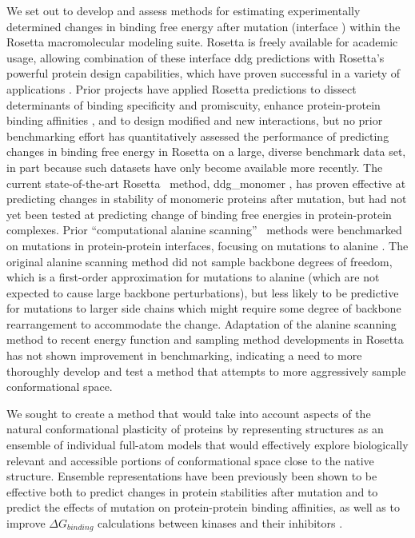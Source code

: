 We set out to develop and assess methods for estimating experimentally determined changes in binding free energy after mutation (interface \ddg) within the Rosetta macromolecular modeling suite. Rosetta is freely available for academic usage, allowing combination of these interface ddg predictions with Rosetta's powerful protein design capabilities, which have proven successful in a variety of applications \cite{kaufmann_practically_2010}.
Prior projects have applied Rosetta predictions to
dissect determinants of binding specificity and promiscuity\cite{boulanger_convergent_2003,mcfarland_symmetry_2003},
enhance protein-protein binding affinities \cite{sammond_structure-based_2007,song_rational_2006},
and to design modified\cite{kortemme_computational_2004,kapp_control_2012}
and new interactions\cite{chevalier_design_2002,fleishman_computational_2011,chevalier_massively_2017}, but no prior benchmarking effort has quantitatively assessed the performance of predicting changes in binding free energy in Rosetta on a large, diverse benchmark data set, in part because such datasets have only become available more recently.
The current state-of-the-art Rosetta \ddg\ method,  ddg\_monomer \cite{kellogg_role_2011}, has proven effective at predicting changes in stability of monomeric proteins after mutation, but had not yet been tested at predicting change of binding free energies in protein-protein complexes.
Prior ``computational alanine scanning'' \ddg\ methods were benchmarked on mutations in protein-protein interfaces, focusing on mutations to alanine \cite{kortemme_simple_2002,kortemme_computational_2004,conchuir_web_2015}.
The original alanine scanning method did not sample backbone degrees of freedom, which is a first-order approximation for mutations to alanine (which are not expected to cause large backbone perturbations\cite{cunningham_high-resolution_1989}), but less likely to be predictive for mutations to larger side chains which might require some degree of backbone rearrangement to accommodate the change.
Adaptation of the alanine scanning method to recent energy function and sampling method developments in Rosetta has not shown improvement in benchmarking\cite{conchuir_web_2015}, indicating a need to more thoroughly develop and test a method that attempts to more aggressively sample conformational space.

We sought to create a method that would take into account aspects of the natural conformational plasticity of proteins by representing structures as an ensemble of individual full-atom models that would effectively explore biologically relevant and accessible portions of conformational space close to the native structure.
Ensemble representations have been previously been shown to be effective both to predict changes in protein stabilities after mutation and to predict the effects of mutation on protein-protein binding affinities\cite{benedix_predicting_2009}, as well as to improve $\Delta G_{binding}$ calculations between kinases and their inhibitors \cite{araki_effect_2016}.

